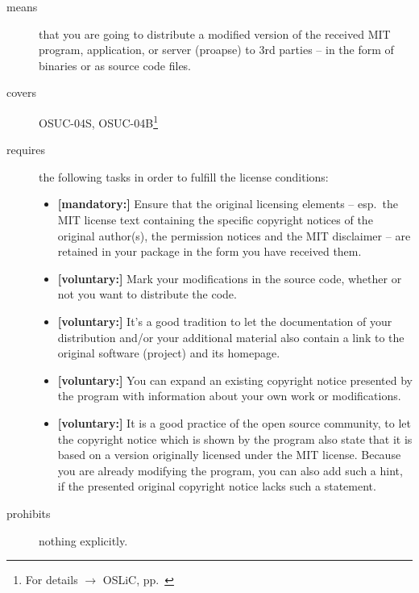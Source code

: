 \begin{description}
\item[means] that you are going to distribute a modified version of the received
MIT program, application, or server (proapse) to 3rd parties --  in the form of
binaries or as source code files.
\item[covers] OSUC-04S, OSUC-04B\footnote{For details $\rightarrow$ OSLiC, pp.\
\pageref{OSUC-04S-DEF}}
\item[requires] the following tasks in order to fulfill the license conditions:
\begin{itemize}
  \item \textbf{[mandatory:]} Ensure that the original licensing elements -- esp.\
  the MIT license text containing the specific copyright notices of the original
  author(s), the permission notices and the MIT disclaimer -- are retained in
  your package in the form you have received them.
  \item \textbf{[voluntary:]} Mark your modifications in the source code,
  whether or not you want to distribute the code.
  \item \textbf{[voluntary:]} It's a good tradition to let the documentation of
  your distribution and/or your additional material also contain a link to the
  original software (project) and its homepage.
  \item \textbf{[voluntary:]} You can expand an existing copyright notice
  presented by the program with information about your own work or
  modifications.
  \item \textbf{[voluntary:]} It is a good practice of the open source
  community, to let the copyright notice which is shown by the program also
  state that it is based on a version originally licensed under the MIT license.
  Because you are already modifying the program, you can also add such a hint,
  if the presented original copyright notice lacks such a statement.
\end{itemize}
\item[prohibits] nothing explicitly.
\end{description}

